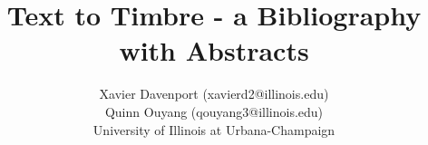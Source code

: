 \documentclass[11pt]{article}
\title{Text to Timbre - a Bibliography with Abstracts}
\author{
    Xavier Davenport (xavierd2@illinois.edu)\\
    Quinn Ouyang (qouyang3@illinois.edu) \\
    University of Illinois at Urbana-Champaign
}
\begin{document}
\maketitle
\nocite{*}


\end{document}

